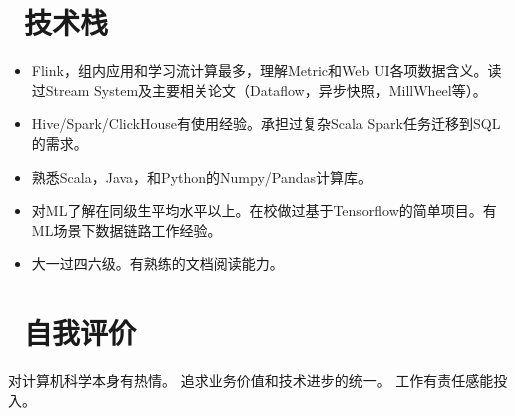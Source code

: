 \documentclass{resume}
\begin{document}
\section{\faCogs\ 技术栈}
\begin{itemize}[parsep=0.5ex]
  \item Flink，组内应用和学习流计算最多，理解Metric和Web UI各项数据含义。读过Stream System及主要相关论文（Dataflow，异步快照，MillWheel等）。
  \item Hive/Spark/ClickHouse有使用经验。承担过复杂Scala Spark任务迁移到SQL的需求。
  \item 熟悉Scala，Java，和Python的Numpy/Pandas计算库。
  \item 对ML了解在同级生平均水平以上。在校做过基于Tensorflow的简单项目。有ML场景下数据链路工作经验。
  \item 大一过四六级。有熟练的文档阅读能力。

  
\end{itemize}

\section{\faInfo\ 自我评价}
\begin{onehalfspacing}
对计算机科学本身有热情。
追求业务价值和技术进步的统一。
工作有责任感能投入。
\end{onehalfspacing}

%
%
\end{document}

